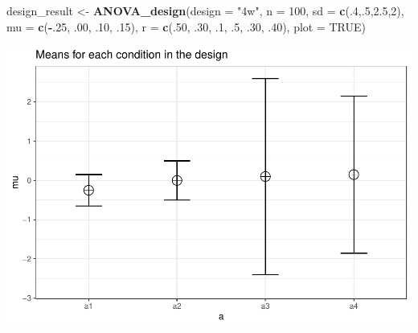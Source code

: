 \documentclass[]{book}
\newenvironment{Shaded}{\begin{snugshade}}{\end{snugshade}}
\newcommand{\DataTypeTok}[1]{\textcolor[rgb]{0.13,0.29,0.53}{#1}}
\newcommand{\DecValTok}[1]{\textcolor[rgb]{0.00,0.00,0.81}{#1}}
\newcommand{\FloatTok}[1]{\textcolor[rgb]{0.00,0.00,0.81}{#1}}
\newcommand{\KeywordTok}[1]{\textcolor[rgb]{0.13,0.29,0.53}{\textbf{#1}}}
\newcommand{\NormalTok}[1]{#1}
\newcommand{\OperatorTok}[1]{\textcolor[rgb]{0.81,0.36,0.00}{\textbf{#1}}}
\newcommand{\OtherTok}[1]{\textcolor[rgb]{0.56,0.35,0.01}{#1}}
\newcommand{\StringTok}[1]{\textcolor[rgb]{0.31,0.60,0.02}{#1}}
\begin{document}
\begin{Shaded}
\begin{Highlighting}[]
\NormalTok{design_result <-}\StringTok{ }\KeywordTok{ANOVA_design}\NormalTok{(}\DataTypeTok{design =} \StringTok{"4w"}\NormalTok{,}
                              \DataTypeTok{n =} \DecValTok{100}\NormalTok{,}
                              \DataTypeTok{sd =} \KeywordTok{c}\NormalTok{(.}\DecValTok{4}\NormalTok{,.}\DecValTok{5}\NormalTok{,}\FloatTok{2.5}\NormalTok{,}\DecValTok{2}\NormalTok{),}
                              \DataTypeTok{mu =} \KeywordTok{c}\NormalTok{(}\OperatorTok{-}\NormalTok{.}\DecValTok{25}\NormalTok{, }\FloatTok{.00}\NormalTok{, }\FloatTok{.10}\NormalTok{, }\FloatTok{.15}\NormalTok{),}
                              \DataTypeTok{r =} \KeywordTok{c}\NormalTok{(.}\DecValTok{50}\NormalTok{, }
                                    \FloatTok{.30}\NormalTok{,}
                                    \FloatTok{.1}\NormalTok{, }
                                    \FloatTok{.5}\NormalTok{,}
                                    \FloatTok{.30}\NormalTok{, }
                                    \FloatTok{.40}\NormalTok{),}
                              \DataTypeTok{plot =} \OtherTok{TRUE}\NormalTok{)}
\end{Highlighting}
\end{Shaded}

\includegraphics{SuperpowerValidation_files/figure-latex/aberson_6.6-1.pdf}

\begin{Shaded}
\end{Shaded}
\end{document}
